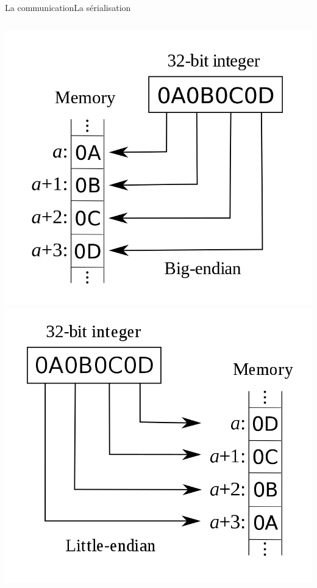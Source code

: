 \documentclass[french]{beamer}
\begin{document}
\begin{frame}{La communication}{La sérialisation}
\begin{columns}
				\begin{column}{0.25\textwidth}
			        \begin{center}
			        	\includegraphics[scale=0.11]{img/endianess1.png}
			        	\includegraphics[scale=0.11]{img/endianess2.png}
			    	\end{center}
				\end{column}
			\end{columns}

	    \end{frame}
\end{document}
